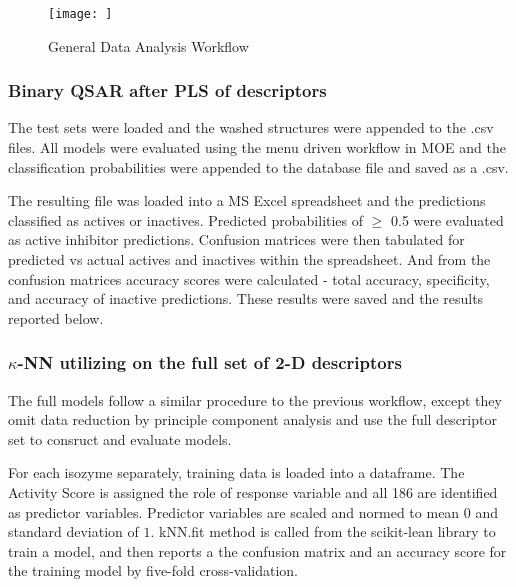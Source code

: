 


\begin{figure}[h,t]
  \caption{General Data Analysis Workflow}
  \centering
   \texttt{[image: ]}
\end{figure}

\subsubsection{Binary QSAR after PLS of descriptors}
The test sets were loaded and the washed structures were appended to the .csv files. All models were evaluated using the menu driven workflow in MOE and the classification probabilities were appended to the database file and saved as a .csv.  

The resulting file was loaded into a MS Excel spreadsheet and the predictions classified as actives or inactives. Predicted probabilities of $\geq$ 0.5 were evaluated as active inhibitor predictions. Confusion matrices were then tabulated for predicted vs actual actives and inactives within the spreadsheet. And from the confusion matrices accuracy scores were calculated - total accuracy, specificity, and accuracy of inactive predictions. These results were saved and the results reported below.

\subsubsection{$\kappa$-NN utilizing on the full set of 2-D descriptors}
The full models follow a similar procedure to the previous workflow, except they omit data reduction by principle component analysis and use the full descriptor set to consruct and evaluate models. 

For each isozyme separately, training data is loaded into a dataframe. The Activity Score is assigned the role of response variable and all 186 are identified as predictor variables. Predictor variables are scaled and normed to mean $0$ and standard deviation of $1$. kNN.fit method is called from the scikit-lean library to train a model, and then reports a the confusion matrix and an accuracy score for the training model by five-fold cross-validation.


